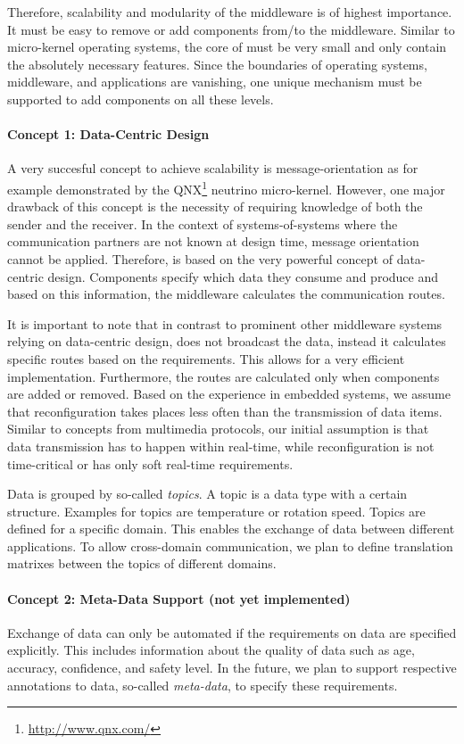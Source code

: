 Therefore, scalability and modularity of the middleware is of highest importance. It must be easy to remove or add components from/to 
the middleware. Similar to micro-kernel operating systems, the core of \xme must be very small and only contain the absolutely necessary
features. Since the boundaries of operating systems, middleware, and applications are vanishing, one unique mechanism must be supported to
add components on all these levels.

\paragraph{Concept 1: Data-Centric Design} A very succesful concept to achieve scalability is message-orientation as for example demonstrated
by the QNX\footnote{\url{http://www.qnx.com/}} neutrino micro-kernel.
However, one major drawback of this concept is the necessity of requiring knowledge of both the sender and the receiver.
In the context of systems-of-systems where the communication partners are not known at design time, message orientation cannot be applied.
Therefore, \xme is based on the very powerful concept of data-centric design. Components specify which data they consume
and produce and based on this information, the middleware calculates the communication routes.

It is important to note that in contrast to prominent other middleware systems relying on data-centric design,
\xme does not broadcast the data, instead it calculates specific routes based on the requirements.
This allows for a very efficient implementation. Furthermore, the routes are calculated only when components are added or removed. Based
on the experience in embedded systems, we assume that reconfiguration takes places less often than the transmission of data items.
Similar to concepts from multimedia protocols,
our initial assumption is that data transmission has to happen within real-time,
while reconfiguration is not time-critical or has only soft real-time requirements.

Data is grouped by so-called \emph{topics}. A topic is a data type with a certain structure.
Examples for topics are temperature or rotation speed. Topics are defined for a specific domain.
This enables the exchange of data between different applications.
To allow cross-domain communication, we plan to define translation matrixes between the topics of different domains.

\paragraph{Concept 2: Meta-Data Support (not yet implemented)}
	Exchange of data can only be automated if the requirements on data are specified explicitly.
	This includes information about the quality of data such as age, accuracy, confidence, and safety level.
	In the future, we plan to support respective annotations to data, so-called \emph{meta-data}, to specify these requirements.
	
